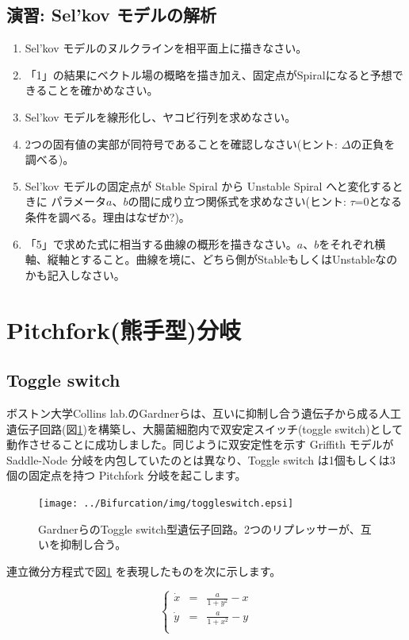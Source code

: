 \subsection{演習: Sel'kov モデルの解析}
\begin{enumerate}
\item Sel'kov モデルのヌルクラインを相平面上に描きなさい。
\item 「1」の結果にベクトル場の概略を描き加え、固定点がSpiralになると予想できることを確かめなさい。
\item Sel'kov モデルを線形化し、ヤコビ行列を求めなさい。
\item 2つの固有値の実部が同符号であることを確認しなさい(ヒント: \(\Delta\)の正負を調べる)。
\item Sel'kov モデルの固定点が Stable Spiral から Unstable Spiral へと変化するときに パラメータ\(a\)、\(b\)の間に成り立つ関係式を求めなさい(ヒント: \(\tau\)=0となる条件を調べる。理由はなぜか?)。
\item 「5」で求めた式に相当する曲線の概形を描きなさい。\(a\)、\(b\)をそれぞれ横軸、縦軸とすること。曲線を境に、どちら側がStableもしくはUnstableなのかも記入しなさい。
\end{enumerate}



\section{Pitchfork(熊手型)分岐}
\subsection{Toggle switch}
ボストン大学Collins lab.のGardnerらは、互いに抑制し合う遺伝子から成る人工遺伝子回路(図\ref{fig:11sysbio})を構築し、大腸菌細胞内で双安定スイッチ(toggle switch)として動作させることに成功しました。同じように双安定性を示す Griffith モデルが Saddle-Node 分岐を内包していたのとは異なり、Toggle switch は1個もしくは3個の固定点を持つ Pitchfork 分岐を起こします。

\begin{figure}[ht]
        \centering \texttt{[image: ../Bifurcation/img/toggleswitch.epsi]}
        \caption{GardnerらのToggle switch型遺伝子回路。2つのリプレッサーが、互いを抑制し合う。}
        \label{fig:11sysbio} \end{figure}

連立微分方程式で図\ref{fig:11sysbio} を表現したものを次に示します。

\[
\left\{
\begin{array}{lcl}
\dot x & = & \displaystyle\frac{a}{1+y^2} - x\\
\dot y & = & \displaystyle\frac{a}{1+x^2} - y\\
\end{array}
\right.
\]

